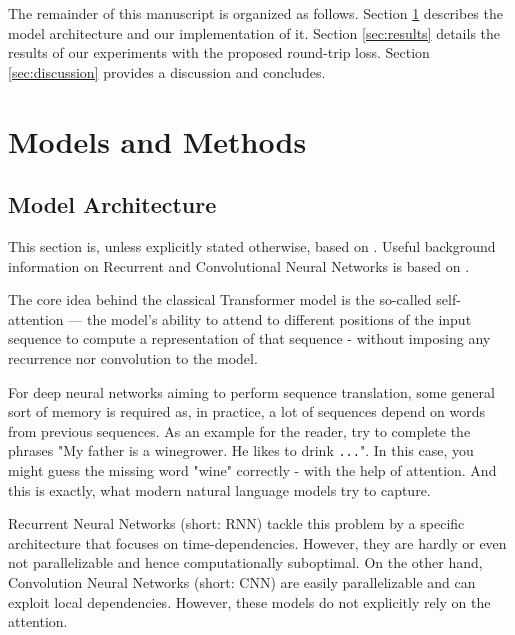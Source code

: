 \documentclass[11pt,a4paper]{article}
\begin{document}
The remainder of this manuscript is organized as follows. Section \ref{sec:models} describes the model architecture and our implementation of it. Section \ref{sec:results} details the results of our experiments with the proposed round-trip loss. Section \ref{sec:discussion} provides a discussion and concludes.

\section{Models and Methods}\label{sec:models}
\subsection{Model Architecture}

This section is, unless explicitly stated otherwise, based on \cite{transformer}. Useful background information on Recurrent and Convolutional Neural Networks is based on \cite{Goodfellow-et-al-2016}.

The core idea behind the classical Transformer model is the so-called self-attention — the model's ability to attend to different positions of the input sequence to compute a representation of that sequence - without imposing any recurrence nor convolution to the model.

For deep neural networks aiming to perform sequence translation, some general sort of memory is required as, in practice, a lot of sequences depend on words from previous sequences. As an example for the reader, try to complete the phrases "My father is a winegrower. He likes to drink {\tt ...}". In this case, you might guess the missing word "wine" correctly - with the help of attention. And this is exactly, what modern natural language models try to capture.

Recurrent Neural Networks (short: RNN) tackle this problem by a specific architecture that focuses on time-dependencies. However, they are hardly or even not parallelizable and hence computationally suboptimal.
On the other hand, Convolution Neural Networks (short: CNN) are easily parallelizable and can exploit local dependencies. However, these models do not explicitly rely on the attention.
\end{document}
